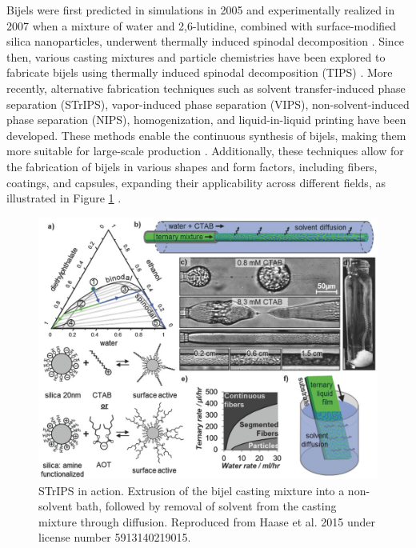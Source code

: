 Bijels were first predicted in simulations in 2005 and experimentally realized in 2007 when a mixture of water and 2,6-lutidine, combined with 
surface-modified silica nanoparticles, underwent thermally induced spinodal decomposition \cite{stratford_colloidal_2005, herzig_bicontinuous_2007}. 
Since then, various casting mixtures and particle chemistries have been explored to fabricate bijels using thermally induced spinodal decomposition (TIPS) 
\cite{lee_bicontinuous_2010, bai_dynamics_2015}. More recently, alternative fabrication techniques such as solvent transfer-induced phase separation (STrIPS), 
vapor-induced phase separation (VIPS), non-solvent-induced phase separation (NIPS), homogenization, and liquid-in-liquid printing have been developed. 
These methods enable the continuous synthesis of bijels, making them more suitable for large-scale production 
\cite{haase_continuous_2015, wang_scalable_2020, cai_bijels_2017, yabuno_preparation_2020, wang_bicontinuous_2023, amirfattahi_fabrication_2024}. 
Additionally, these techniques allow for the fabrication of bijels in various shapes and form factors, including fibers, coatings, and capsules, expanding 
their applicability across different fields, as illustrated in Figure \ref{fig:strips} 
\cite{haase_continuous_2015, boakye-ansah_controlling_2020, kharal_hightensile_2020, wang_bicontinuous_2023}.  

\begin{figure}[h]
    \centering
    \includegraphics[scale = 4]{figures/introduction/STrIPS.jpg}
    \caption{STrIPS in action. Extrusion of the bijel casting mixture into a non-solvent bath, followed by removal of solvent from 
    the casting mixture through diffusion. Reproduced from Haase et al. 2015 under license number 5913140219015. \cite{haase_continuous_2015}}
    \label{fig:strips}
\end{figure}

